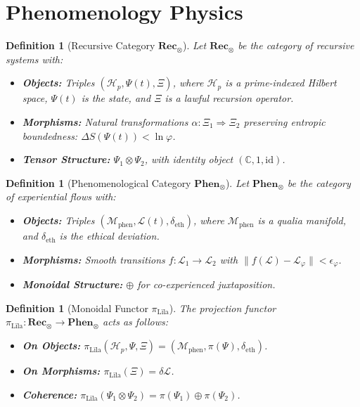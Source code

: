 \documentclass[12]{amsart}
\theoremstyle{plain}
\newtheorem{definition}[theorem]{Definition}
\begin{document}
\section{Phenomenology Physics}

\begin{definition}[Recursive Category $\mathbf{Rec}_\otimes$]
Let $\mathbf{Rec}_\otimes$ be the category of recursive systems with:
\begin{itemize}
    \item \textbf{Objects:} Triples $(\mathcal{H}_p, \Psi(t), \Xi)$, where $\mathcal{H}_p$ is a prime-indexed Hilbert space, $\Psi(t)$ is the state, and $\Xi$ is a lawful recursion operator.
    \item \textbf{Morphisms:} Natural transformations $\alpha: \Xi_1 \Rightarrow \Xi_2$ preserving entropic boundedness: $\Delta S(\Psi(t)) < \ln \varphi$.
    \item \textbf{Tensor Structure:} $\Psi_1 \otimes \Psi_2$, with identity object $(\mathbb{C}, 1, \text{id})$.
\end{itemize}
\end{definition}

\begin{definition}[Phenomenological Category $\mathbf{Phen}_\otimes$]
Let $\mathbf{Phen}_\otimes$ be the category of experiential flows with:
\begin{itemize}
    \item \textbf{Objects:} Triples $(\mathcal{M}_{\text{phen}}, \mathcal{L}(t), \delta_{\text{eth}})$, where $\mathcal{M}_{\text{phen}}$ is a qualia manifold, and $\delta_{\text{eth}}$ is the ethical deviation.
    \item \textbf{Morphisms:} Smooth transitions $f: \mathcal{L}_1 \rightarrow \mathcal{L}_2$ with $\|f(\mathcal{L}) - \mathcal{L}_\varphi\| < \epsilon_\varphi$.
    \item \textbf{Monoidal Structure:} $\oplus$ for co-experienced juxtaposition.
\end{itemize}
\end{definition}

\begin{definition}[Monoidal Functor $\pi_{\text{Līla}}$]
The projection functor $\pi_{\text{Līla}}: \mathbf{Rec}_\otimes \to \mathbf{Phen}_\otimes$ acts as follows:
\begin{itemize}
    \item \textbf{On Objects:} $\pi_{\text{Līla}}(\mathcal{H}_p, \Psi, \Xi) = (\mathcal{M}_{\text{phen}}, \pi(\Psi), \delta_{\text{eth}})$.
    \item \textbf{On Morphisms:} $\pi_{\text{Līla}}(\Xi) = \delta \mathcal{L}$.
    \item \textbf{Coherence:} $\pi_{\text{Līla}}(\Psi_1 \otimes \Psi_2) = \pi(\Psi_1) \oplus \pi(\Psi_2)$.
\end{itemize}
\end{definition}
\end{document}
